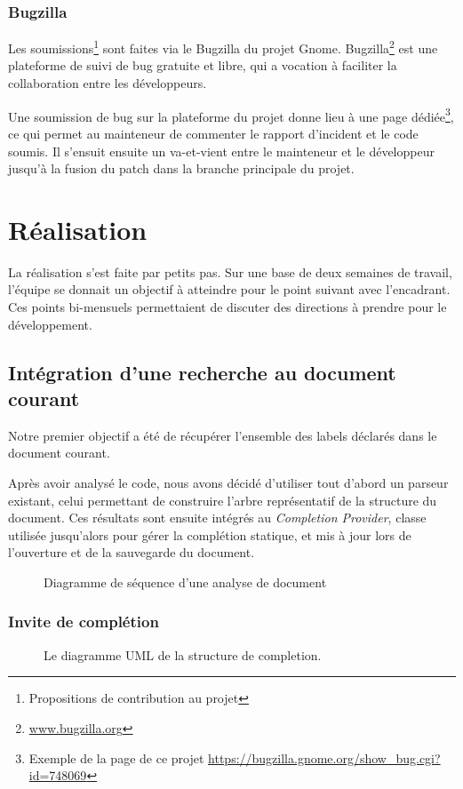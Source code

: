 \documentclass[a4paper,11pt]{report}
\begin{document}
\subsection{Bugzilla}
Les soumissions\footnote{Propositions de contribution au projet} sont faites via le Bugzilla du projet Gnome.
Bugzilla\footnote{\url{www.bugzilla.org}} est une plateforme de suivi de bug gratuite et libre, qui a vocation à faciliter la collaboration entre les développeurs.

Une soumission de bug sur la plateforme du projet donne lieu à une page dédiée\footnote{Exemple de la page de ce projet \url{https://bugzilla.gnome.org/show_bug.cgi?id=748069}}, ce qui permet au mainteneur de commenter le rapport d'incident et le code soumis.
Il s'ensuit ensuite un va-et-vient entre le mainteneur et le développeur jusqu'à la fusion du patch dans la branche principale du projet.

\chapter{Réalisation}
La réalisation s'est faite par petits pas. Sur une base de deux semaines de travail, l'équipe se donnait un objectif à atteindre pour le point suivant avec l'encadrant.
Ces points bi-mensuels permettaient de discuter des directions à prendre pour le développement.

\section{Intégration d'une recherche au document courant}
Notre premier objectif a été de récupérer l'ensemble des labels déclarés dans le document courant.

Après avoir analysé le code, nous avons décidé d'utiliser tout d'abord un parseur existant, celui permettant de construire l'arbre représentatif de la structure du document.
Ces résultats sont ensuite intégrés au \textit{Completion Provider}, classe utilisée jusqu'alors pour gérer la complétion statique, et mis à jour lors de l'ouverture et de la sauvegarde du document.

\begin{figure}[h]
\label{fig:doc_opening}
\centering

\caption{Diagramme de séquence d'une analyse de document}
\end{figure}

\subsection{Invite de complétion}
\begin{figure}[h!]
\label{fig:uml_completion_structure}
\centering

\caption{Le diagramme UML de la structure de completion.}
\end{figure}
\end{document}
